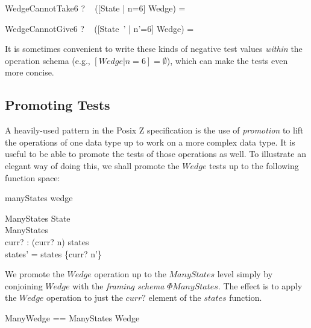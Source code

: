 \documentclass{llncs}
\begin{document}
\begin{theorem}{WedgeCannotTake6}
  \vdash? ~ ([State | n=6] \land Wedge) = \emptyset
\end{theorem}
\vspace{-5ex}
\begin{theorem}{WedgeCannotGive6}
  \vdash? ~ ([State~' | n'=6] \land Wedge) = \emptyset
\end{theorem}

It is sometimes convenient to write these kinds of negative test values
\emph{within} the operation schema (e.g., $[Wedge | n=6] = \emptyset$),
which can make the tests even more concise.


\subsection{Promoting Tests}

A heavily-used pattern in the Posix Z specification is the use of
\emph{promotion} to lift the operations of one data type up to work on a
more complex data type.  It is useful to be able to promote the tests
of those operations as well.  To illustrate an elegant way of doing this,
we shall promote the $Wedge$ tests up to the following function space:

\begin{zsection}
  \SECTION manyStates \parents wedge
\end{zsection}

\vspace{-5ex}
\begin{schema}{\Phi ManyStates}
  \Delta State \\
  \Delta ManyStates \\
  curr? : \nat
\where
  (curr? \mapsto n) \in states \\
  states' = states \oplus \{curr? \mapsto n'\}
\end{schema}

We promote the $Wedge$ operation up to the $ManyStates$ level simply by
conjoining $Wedge$ with the \emph{framing schema} $\Phi ManyStates$.
The effect is to apply the $Wedge$ operation to just the $curr?$ element of
the $states$ function. 

\begin{zed}
  ManyWedge == \Phi ManyStates \land Wedge
\end{zed}
\end{document}
